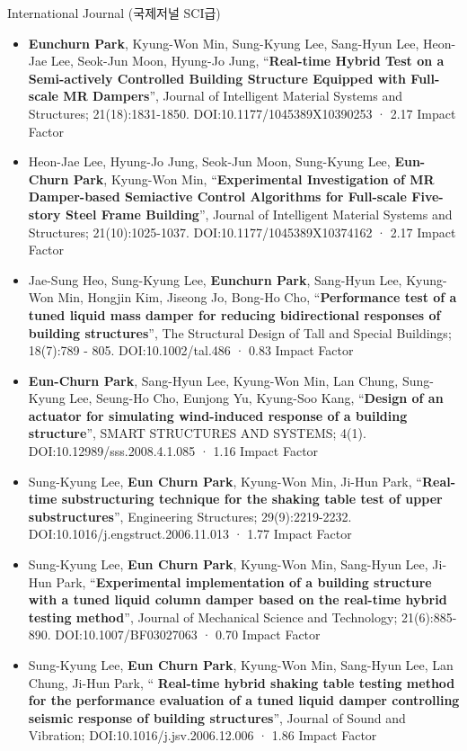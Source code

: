\documentclass[usepdftitle=false]{beamer}
\newcommand\Fontvi{\fontsize{6}{7.2}\selectfont}
\begin{document}
\begin{frame}{International Journal (국제저널 SCI급)}
\Fontvi
\begin{itemize}
\item \textbf{Eunchurn Park}, Kyung-Won Min, Sung-Kyung Lee, Sang-Hyun Lee, Heon-Jae Lee, Seok-Jun Moon, Hyung-Jo Jung, “\textbf{Real-time Hybrid Test on a Semi-actively Controlled Building Structure Equipped with Full-scale MR Dampers}”, Journal of Intelligent Material Systems and Structures; 21(18):1831-1850. DOI:10.1177/1045389X10390253 · 2.17 Impact Factor
\item Heon-Jae Lee, Hyung-Jo Jung, Seok-Jun Moon, Sung-Kyung Lee, \textbf{Eun-Churn Park}, Kyung-Won Min, “\textbf{Experimental Investigation of MR Damper-based Semiactive Control Algorithms for Full-scale Five-story Steel Frame Building}”, Journal of Intelligent Material Systems and Structures; 21(10):1025-1037. DOI:10.1177/1045389X10374162 · 2.17 Impact Factor
\item Jae-Sung Heo, Sung-Kyung Lee, \textbf{Eunchurn Park}, Sang-Hyun Lee, Kyung-Won Min, Hongjin Kim, Jiseong Jo, Bong-Ho Cho, “\textbf{Performance test of a tuned liquid mass damper for reducing bidirectional responses of building structures}”, The Structural Design of Tall and Special Buildings; 18(7):789 - 805. DOI:10.1002/tal.486 · 0.83 Impact Factor
\item \textbf{Eun-Churn Park}, Sang-Hyun Lee, Kyung-Won Min, Lan Chung, Sung-Kyung Lee, Seung-Ho Cho, Eunjong Yu, Kyung-Soo Kang, “\textbf{Design of an actuator for simulating wind-induced response of a building structure}”, SMART STRUCTURES AND SYSTEMS; 4(1). DOI:10.12989/sss.2008.4.1.085 · 1.16 Impact Factor
\item Sung-Kyung Lee, \textbf{Eun Churn Park}, Kyung-Won Min, Ji-Hun Park, “\textbf{Real-time substructuring technique for the shaking table test of upper substructures}”, Engineering Structures; 29(9):2219-2232. DOI:10.1016/j.engstruct.2006.11.013 · 1.77 Impact Factor
\item Sung-Kyung Lee, \textbf{Eun Churn Park}, Kyung-Won Min, Sang-Hyun Lee, Ji-Hun Park, “\textbf{Experimental implementation of a building structure with a tuned liquid column damper based on the real-time hybrid testing method}”, Journal of Mechanical Science and Technology; 21(6):885-890. DOI:10.1007/BF03027063 · 0.70 Impact Factor
\item Sung-Kyung Lee, \textbf{Eun Churn Park}, Kyung-Won Min, Sang-Hyun Lee, Lan Chung, Ji-Hun Park, “ \textbf{Real-time hybrid shaking table testing method for the performance evaluation of a tuned liquid damper controlling seismic response of building structures}”, Journal of Sound and Vibration; DOI:10.1016/j.jsv.2006.12.006 · 1.86 Impact Factor
\end{itemize}
\end{frame}
\end{document}
